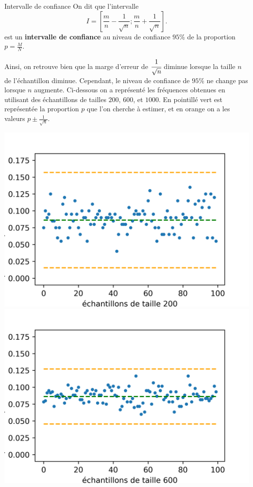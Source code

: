 \documentclass[11pt]{article}
\begin{document}
\begin{defi}{Intervalle de confiance}
  On dit que l'intervalle
  \[
    I = \left[ \frac{m}{n}-\frac{1}{\sqrt n}; \frac{m}{n}+\frac{1}{\sqrt n}
    \right].
  \]
  est un \textbf{intervalle de confiance} au niveau de confiance $95$\% de la
  proportion $p=\frac{M}{N}$.
\end{defi}
\noindent Ainsi, on retrouve bien que la marge d'erreur de $\cfrac{1}{\sqrt n}$ diminue
lorsque la taille $n$ de l'échantillon diminue. Cependant, le niveau de
confiance de $95$\% ne change pas lorsque $n$ augmente. Ci-dessous on a
représenté les fréquences obtenues en utilisant des échantillons de tailles
$200$, $600$, et $1000$. En pointillé vert est représentée la proportion $p$ que
l'on cherche à estimer, et en orange on a les valeurs $p\pm \frac{1}{\sqrt n}$.
\begin{center}
  \includegraphics[scale=.7]{simul_multiple-0.png}
  \includegraphics[scale=.7]{simul_multiple-1.png}

\end{center}
\end{document}
